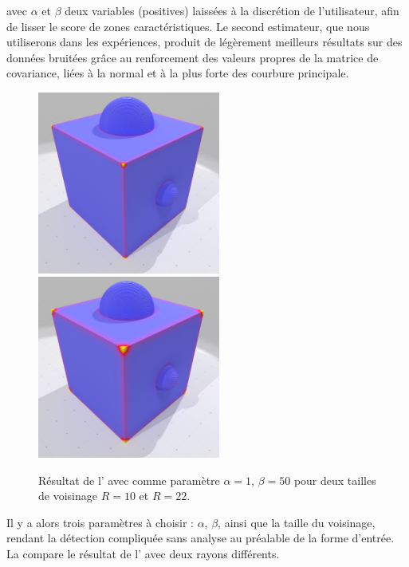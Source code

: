 avec $\alpha$ et $\beta$ deux variables (positives) laissées à la discrétion de
l'utilisateur, afin de lisser le score de zones caractéristiques. Le second
estimateur, que nous utiliserons dans les expériences, produit de légèrement
meilleurs résultats sur des données bruitées grâce au renforcement des valeurs
propres de la matrice de covariance, liées à la normal et à la plus forte des
courbure principale.


\begin{figure}[hbt]
  \centering
  \includegraphics[height=6cm]{images/Feature/CubeSphere_Moments_r_10_c1}
  \includegraphics[height=6cm]{images/Feature/CubeSphere_Moments_r_22_c1}
  \caption[Résultat de l']{Résultat de l' avec comme paramètre $\alpha = 1$, $\beta = 50$ pour deux tailles de voisinage $R = 10$ et $R = 22$.}\label{fig:moment-C1}
\end{figure}

Il y a alors trois paramètres à choisir : $\alpha$, $\beta$, ainsi que la
taille du voisinage, rendant la détection compliquée sans analyse au préalable
de la forme d'entrée. La  compare le résultat de l' avec deux rayons différents.

